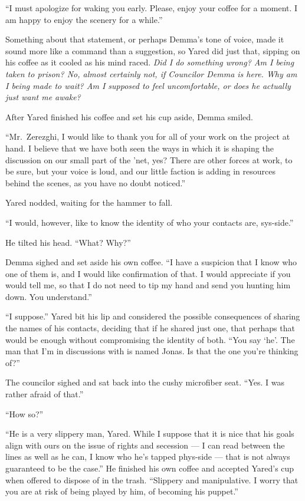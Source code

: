 ``I must apologize for waking you early. Please, enjoy your coffee for a moment. I am happy to enjoy the scenery for a while.''

Something about that statement, or perhaps Demma's tone of voice, made it sound more like a command than a suggestion, so Yared did just that, sipping on his coffee as it cooled as his mind raced. \emph{Did I do something wrong? Am I being taken to prison? No, almost certainly not, if Councilor Demma is here. Why am I being made to wait? Am I supposed to feel uncomfortable, or does he actually just want me awake?}

After Yared finished his coffee and set his cup aside, Demma smiled.

``Mr.~Zerezghi, I would like to thank you for all of your work on the project at hand. I believe that we have both seen the ways in which it is shaping the discussion on our small part of the 'net, yes? There are other forces at work, to be sure, but your voice is loud, and our little faction is adding in resources behind the scenes, as you have no doubt noticed.''

Yared nodded, waiting for the hammer to fall.

``I would, however, like to know the identity of who your contacts are, sys-side.''

He tilted his head. ``What? Why?''

Demma sighed and set aside his own coffee. ``I have a suspicion that I know who one of them is, and I would like confirmation of that. I would appreciate if you would tell me, so that I do not need to tip my hand and send you hunting him down. You understand.''

``I suppose.'' Yared bit his lip and considered the possible consequences of sharing the names of his contacts, deciding that if he shared just one, that perhaps that would be enough without compromising the identity of both. ``You say `he'. The man that I'm in discussions with is named Jonas. Is that the one you're thinking of?''

The councilor sighed and sat back into the cushy microfiber seat. ``Yes. I was rather afraid of that.''

``How so?''

``He is a very slippery man, Yared. While I suppose that it is nice that his goals align with ours on the issue of rights and secession — I can read between the lines as well as he can, I know who he's tapped phys-side — that is not always guaranteed to be the case.'' He finished his own coffee and accepted Yared's cup when offered to dispose of in the trash. ``Slippery and manipulative. I worry that you are at risk of being played by him, of becoming his puppet.''


